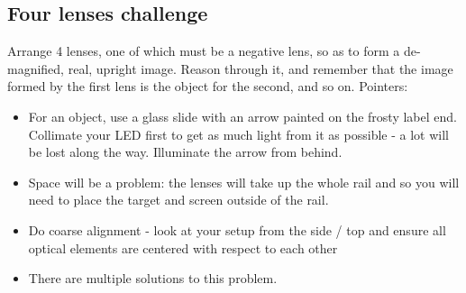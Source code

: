 \documentclass[a4paper]{report}
\begin{document}
	\clearpage

    \subsection{Four lenses challenge}
	Arrange 4 lenses, one of which must be a negative lens, so as to form a de-magnified, real, upright image.
	Reason through it, and remember that the image formed by the first lens is the object for the second, and so on. Pointers:
	\begin{itemize}
    	\item For an object, use a glass slide with an arrow painted on the frosty label end. Collimate your LED first to get as much light from it as possible - a lot will be lost along the way. Illuminate the arrow from behind.
		\item Space will be a problem: the lenses will take up the whole rail and so you will need to place the target and screen outside of the rail.
		\item Do coarse alignment - look at your setup from the side / top and ensure all optical elements are centered with respect to each other
		\item There are multiple solutions to this problem.
	\end{itemize}
\end{document}
